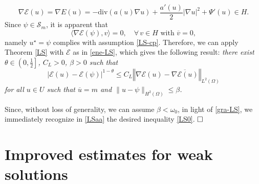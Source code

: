 \documentclass[11pt,reqno]{amsart}
\theoremstyle{remark}
\newcommand \norm[1] {\left\Vert #1\right\Vert}
\def\E{\mathcal{E}}
\def\div{\mathrm{div}}
\numberwithin{equation}{section}
\begin{document}
\begin{equation}
\label{gra-LS}
\nabla \mathcal{E}(u)=\nabla{E}(u)=-\div(a(u)\nabla u)+\frac{a'(u)}{2} |\nabla u|^2+\Psi'(u)\in H.
\end{equation}
Since $\psi\in \mathcal{S}_m$, it is apparent that
$$\langle \nabla \E (\psi), v \rangle =0, \quad \forall \, v \in H \text{ with } \overline{v}=0,$$
namely $u^\star=\psi$ complies with assumption \eqref{LS-cp}.
Therefore, we can apply Theorem \ref{LS} with $\mathcal{E}$ as in \eqref{ene-LS}, which gives the following result:
 \emph{there exist $\theta \in \left(0,\frac12\right]$, $C_L>0$, $\beta>0$ such that
\begin{equation}
\label{LSaa}
|\mathcal{E}(u)- \mathcal{E}(\psi)|^{1-\theta}
\leq C_L \norm{\nabla \mathcal{E}(u)-\overline{\nabla\mathcal{E}(u)} }_{L^2(\Omega)}\!
\end{equation}
for all $u\in U$ such that $\overline{u}=m$ and
$\| u-\psi\|_{H^2(\Omega)}\leq \beta$.
}

\noindent
Since, without loss of generality, we can assume $\beta<\omega_0$, in light of  \eqref{gra-LS}, we immediately recognize in \eqref{LSaa} the desired inequality \eqref{LS0}. $\hfill \Box$

\section{Improved estimates for weak solutions}
\label{S-WEAK}
\setcounter{equation}{0}
\end{document}
